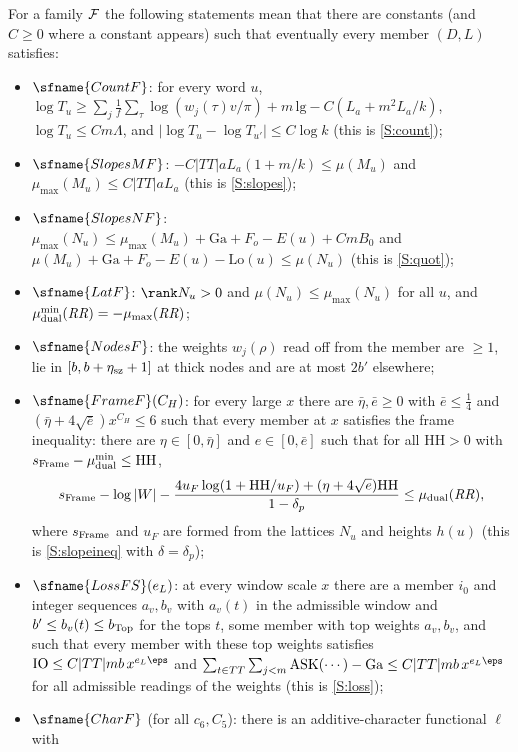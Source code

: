 \begin{definition}\label{pf:top-shape:famstmts}
For a family $\mathcal{F}$ the following statements mean that there are constants (and $C\ge0$ where a constant
appears) such that eventually every member $(D,L)$ satisfies:
\begin{itemize}
\item $\sfname{CountF}$: for every word $u$, $\log T_u\ge\sum_{j}\frac1f\sum_\tau\log(w_j(\tau)v/\pi)+m\,\mathrm{lg}
-C(L_a+m^2L_a/k)$, $\log T_u\le Cm\Lambda$, and $|\log T_u-\log T_{u'}|\le C\log k$ (this is \ref{S:count});
\item $\sfname{SlopesMF}$: $-C|TT|aL_a(1+m/k)\le\mu(M_u)$ and $\mu_{\max}(M_u)\le C|TT|aL_a$ (this is \ref{S:slopes});
\item $\sfname{SlopesNF}$: $\mu_{\max}(N_u)\le\mu_{\max}(M_u)+\mathrm{Ga}+F_o-E(u)+CmB_0$ and
$\mu(M_u)+\mathrm{Ga}+F_o-E(u)-\mathrm{Lo}(u)\le\mu(N_u)$ (this is \ref{S:quot});
\item $\sfname{LatF}$: $\rank N_u>0$ and $\mu(N_u)\le\mu_{\max}(N_u)$ for all $u$, and
$\mu^{\min}_{\rm dual}(\mathit{RR})=-\mu_{\max}(\mathit{RR})$;
\item $\sfname{NodesF}$: the weights $w_j(\rho)$ read off from the member are $\ge1$, lie in $[b,b+\eta_{\rm sz}+1]$ at
thick nodes and are at most $2b'$ elsewhere;
\item $\sfname{FrameF}(C_H)$: for every large $x$ there are $\bar\eta,\bar e\ge0$ with $\bar e\le\frac14$ and
$(\bar\eta+4\sqrt{\bar e})x^{C_H}\le6$ such that every member at $x$ satisfies the frame inequality: there are
$\eta\in[0,\bar\eta]$ and $e\in[0,\bar e]$ such that for all $\mathrm{HH}>0$ with $s_{\rm Frame}-\mu^{\min}_{\rm dual}\le\mathrm{HH}$,
\[
s_{\rm Frame}-\log|W|-\frac{4u_F\log(1+\mathrm{HH}/u_F)+(\eta+4\sqrt e)\mathrm{HH}}{1-\delta_p}\le\mu_{\rm dual}(\mathit{RR}),
\]
where $s_{\rm Frame}$ and $u_F$ are formed from the lattices $N_u$ and heights $h(u)$ (this is \ref{S:slopeineq} with
$\delta=\delta_p$);
\item $\sfname{LossFS}(e_L)$: at every window scale $x$ there are a member $i_0$ and integer sequences $a_v,b_v$ with
$a_v(t)$ in the admissible window and $b'\le b_v(t)\le b_{\rm Top}$ for the tops $t$, some member with top weights
$a_v,b_v$, and such that every member with these top weights satisfies
$\mathrm{IO}\le C|TT|mb\,x^{e_L\eps}$ and $\sum_{t\in TT}\sum_{j<m}\mathrm{ASK}(\cdots)-\mathrm{Ga}\le C|TT|mb\,x^{e_L\eps}$
for all admissible readings of the weights (this is \ref{S:loss});
\item $\sfname{CharF}$ (for all $c_6,C_5$): there is an additive-character functional $\ell$ with

\end{itemize}
\end{definition}
